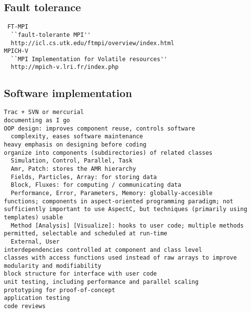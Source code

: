 \documentclass[14pt,letter]{article}
\begin{document}
\subsection{Fault tolerance}

\begin{verbatim}
 FT-MPI 
  ``fault-tolerante MPI''
  http://icl.cs.utk.edu/ftmpi/overview/index.html 
MPICH-V 
  ``MPI Implementation for Volatile resources''
  http://mpich-v.lri.fr/index.php 
\end{verbatim}

\subsection{Software implementation}

\begin{verbatim}
Trac + SVN or mercurial
documenting as I go
OOP design: improves component reuse, controls software
  complexity, eases software maintenance
heavy emphasis on designing before coding
organize into components (subdirectories) of related classes
  Simulation, Control, Parallel, Task
  Amr, Patch: stores the AMR hierarchy
  Fields, Particles, Array: for storing data
  Block, Fluxes: for computing / communicating data
  Performance, Error, Parameters, Memory: globally-accesible functions; components in aspect-oriented programming paradigm; not sufficiently important to use AspectC, but techniques (primarily using templates) usable
  Method [Analysis] [Visualize]: hooks to user code; multiple methods permitted, selectable and scheduled at run-time
  External, User
interdependencies controlled at component and class level
classes with access functions used instead of raw arrays to improve modularity and modifiability
block structure for interface with user code
unit testing, including performance and parallel scaling
prototyping for proof-of-concept
application testing
code reviews
\end{verbatim}
\end{document}
